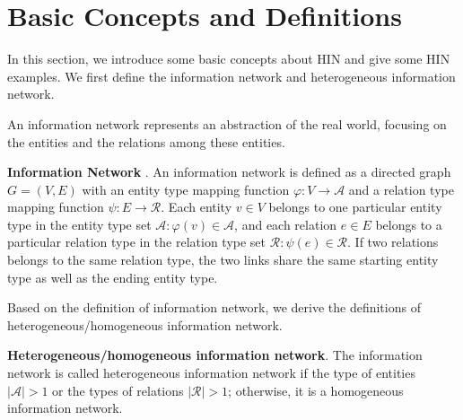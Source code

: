 \documentclass{acm_proc_article-csis8101}
\begin{document}


\section{Basic Concepts and Definitions}

In this section, we introduce some basic concepts about HIN and give some HIN examples. We first define the information network and heterogeneous information network.

An information network represents an abstraction of the real world, focusing on the entities and the relations among these entities.

\begin{definition}
{\bf Information Network} \cite{sun2013mining,sun2009ranking}. An information network is defined as a directed graph $G=(V,E)$ with an entity type mapping function $\varphi: V \rightarrow \mathcal{A}$ and a relation type mapping function $\psi: E \rightarrow \mathcal{R}$. Each entity $v \in V$ belongs to one particular entity type in the entity type set $\mathcal{A}: \varphi(v) \in \mathcal{A}$, and each relation $e \in E$ belongs to a particular relation type in the relation type set $\mathcal{R}: \psi(e) \in \mathcal{R}$. If two relations belongs to the same relation type, the two links share the same starting entity type as well as the ending entity type.
\end{definition}

Based on the definition of information network, we derive the definitions of heterogeneous/homogeneous information network.

\begin{definition}
{\bf Heterogeneous/homogeneous information network}. The information network is called heterogeneous information network if the type of entities $|\mathcal{A}|>1$ or the types of relations $|\mathcal{R}|>1$; otherwise, it is a homogeneous information network.
\end{definition}
\end{document}
